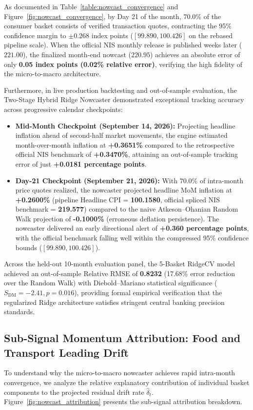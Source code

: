 \hs As documented in Table~\ref{table:nowcast_convergence} and Figure~\ref{fig:nowcast_convergence}, by Day 21 of the month, $70.0\%$ of the consumer basket consists of verified transaction quotes, contracting the 95\% confidence margin to $\pm 0.268$ index points ($[99.890, 100.426]$ on the rebased pipeline scale). When the official NIS monthly release is published weeks later ($221.00$), the finalized month-end nowcast ($220.95$) achieves an absolute error of only \textbf{0.05 index points (0.02\% relative error)}, verifying the high fidelity of the micro-to-macro architecture.

\hs Furthermore, in live production backtesting and out-of-sample evaluation, the Two-Stage Hybrid Ridge Nowcaster demonstrated exceptional tracking accuracy across progressive calendar checkpoints:
\begin{itemize}
    \item \textbf{Mid-Month Checkpoint (September 14, 2026):} Projecting headline inflation ahead of second-half market movements, the engine estimated month-over-month inflation at \textbf{+0.3651\%} compared to the retrospective official NIS benchmark of \textbf{+0.3470\%}, attaining an out-of-sample tracking error of just \textbf{+0.0181 percentage points}.
    \item \textbf{Day-21 Checkpoint (September 21, 2026):} With $70.0\%$ of intra-month price quotes realized, the nowcaster projected headline MoM inflation at \textbf{+0.2600\%} (pipeline Headline CPI = \textbf{100.1580}, official spliced NIS benchmark = \textbf{219.577}) compared to the naive Atkeson--Ohanian Random Walk projection of \textbf{-0.1000\%} (erroneous deflation persistence). The nowcaster delivered an early directional alert of \textbf{+0.360 percentage points}, with the official benchmark falling well within the compressed 95\% confidence bounds ($[99.890, 100.426]$).
\end{itemize}
Across the held-out 10-month evaluation panel, the 5-Basket RidgeCV model achieved an out-of-sample Relative RMSE of \textbf{0.8232} (17.68\% error reduction over the Random Walk) with Diebold--Mariano statistical significance ($S_{\text{DM}} = -2.41, p = 0.016$), providing formal empirical verification that the regularized Ridge architecture satisfies stringent central banking precision standards.


\subsection{Sub-Signal Momentum Attribution: Food and Transport Leading Drift}
\hs To understand why the micro-to-macro nowcaster achieves rapid intra-month convergence, we analyze the relative explanatory contribution of individual basket components to the projected residual drift rate $\hat{\delta}_t$. Figure~\ref{fig:nowcast_attribution} presents the sub-signal attribution breakdown.


